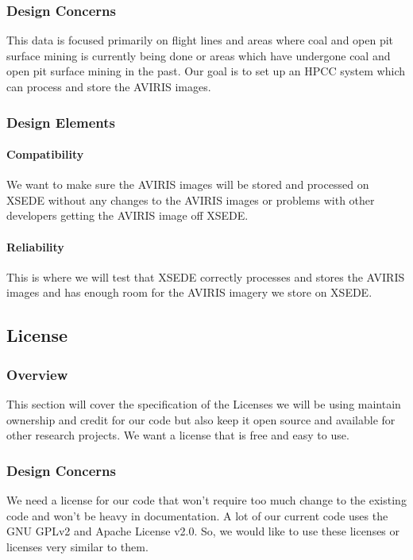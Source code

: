 \documentclass[10pt,draftclsnofoot,onecolumn,journal,compsoc]{IEEEtran}
\begin{document}
\subsubsection{Design Concerns}

\noindent This data is focused primarily on flight lines and areas where coal and open pit surface mining is currently being done or areas which have undergone coal and open pit surface mining in the past. Our goal is to set up an HPCC system which can process and store the AVIRIS images.

\subsubsection{Design Elements}
\paragraph{Compatibility}

\noindent We want to make sure the AVIRIS images will be stored and processed on XSEDE without any changes to the AVIRIS images or problems with other developers getting the AVIRIS image off XSEDE.


\paragraph{Reliability}

\noindent This is where we will test that XSEDE correctly processes and stores the AVIRIS images and has enough room for the AVIRIS imagery we store on XSEDE.

\subsection{License}
\subsubsection{Overview}
\noindent This section will cover the specification of the Licenses we will be using maintain ownership and credit for our code but also keep it open source and available for other research projects. We want a license that is free and easy to use.
\subsubsection{Design Concerns}
We need a license for our code that won’t require too much change to the existing code and won’t be heavy in documentation. A lot of our current code uses the GNU GPLv2 and Apache License v2.0. So, we would like to use these licenses or licenses very similar to them.
\end{document}

